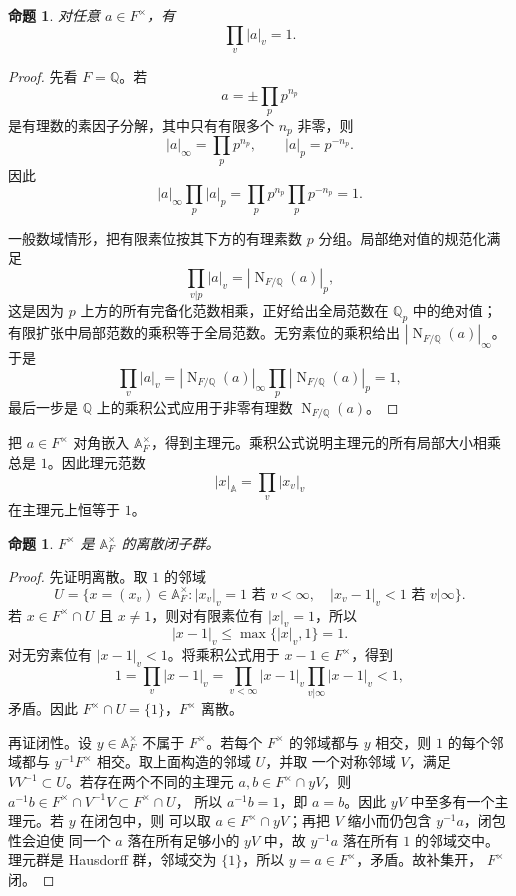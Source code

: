 \documentclass[11pt,a4paper,openany]{ctexbook}
\numberwithin{equation}{chapter}
\newcommand{\Q}{\mathbb{Q}}
\newcommand{\A}{\mathbb{A}}
\newcommand{\Nm}{\operatorname{N}}
\theoremstyle{plain}
\newtheorem{proposition}[theorem]{命题}
\theoremstyle{definition}
\theoremstyle{remark}
\begin{document}
\begin{proposition}
对任意 $a\in F^\times$，有
\[
 \prod_v |a|_v=1.
\]
\end{proposition}

\begin{proof}
先看 $F=\Q$。若
\[
 a=\pm\prod_pp^{n_p}
\]
是有理数的素因子分解，其中只有有限多个 $n_p$ 非零，则
\[
 |a|_\infty=\prod_pp^{n_p},\qquad |a|_p=p^{-n_p}.
\]
因此
\[
 |a|_\infty\prod_p|a|_p
 =\prod_pp^{n_p}\prod_pp^{-n_p}=1.
\]

一般数域情形，把有限素位按其下方的有理素数 $p$ 分组。局部绝对值的规范化满足
\[
 \prod_{v|p}|a|_v=|\Nm_{F/\Q}(a)|_p,
\]
这是因为 $p$ 上方的所有完备化范数相乘，正好给出全局范数在 $\Q_p$ 中的绝对值；
有限扩张中局部范数的乘积等于全局范数。无穷素位的乘积给出
$|\Nm_{F/\Q}(a)|_\infty$。于是
\[
 \prod_v|a|_v
 =|\Nm_{F/\Q}(a)|_\infty\prod_p|\Nm_{F/\Q}(a)|_p=1,
\]
最后一步是 $\Q$ 上的乘积公式应用于非零有理数 $\Nm_{F/\Q}(a)$。
\end{proof}

把 $a\in F^\times$ 对角嵌入 $\A_F^\times$，得到主理元。乘积公式说明主理元的所有局部大小相乘总是 $1$。因此理元范数
\[
 |x|_\A=\prod_v|x_v|_v
\]
在主理元上恒等于 $1$。

\begin{proposition}
$F^\times$ 是 $\A_F^\times$ 的离散闭子群。
\end{proposition}

\begin{proof}
先证明离散。取 $1$ 的邻域
\[
 U=\{x=(x_v)\in\A_F^\times:
 |x_v|_v=1\text{ 若 }v<\infty,\quad |x_v-1|_v<1\text{ 若 }v|\infty\}.
\]
若 $x\in F^\times\cap U$ 且 $x\ne1$，则对有限素位有 $|x|_v=1$，所以
\[
 |x-1|_v\le\max\{|x|_v,1\}=1.
\]
对无穷素位有 $|x-1|_v<1$。将乘积公式用于 $x-1\in F^\times$，得到
\[
 1=\prod_v|x-1|_v
 =\prod_{v<\infty}|x-1|_v\prod_{v|\infty}|x-1|_v<1,
\]
矛盾。因此 $F^\times\cap U=\{1\}$，$F^\times$ 离散。

再证闭性。设 $y\in\A_F^\times$ 不属于 $F^\times$。若每个 $F^\times$ 的邻域都与
$y$ 相交，则 $1$ 的每个邻域都与 $y^{-1}F^\times$ 相交。取上面构造的邻域 $U$，并取
一个对称邻域 $V$，满足 $VV^{-1}\subset U$。若存在两个不同的主理元
$a,b\in F^\times\cap yV$，则 $a^{-1}b\in F^\times\cap V^{-1}V\subset F^\times\cap U$，
所以 $a^{-1}b=1$，即 $a=b$。因此 $yV$ 中至多有一个主理元。若 $y$ 在闭包中，则
可以取 $a\in F^\times\cap yV$；再把 $V$ 缩小而仍包含 $y^{-1}a$，闭包性会迫使
同一个 $a$ 落在所有足够小的 $yV$ 中，故 $y^{-1}a$ 落在所有 $1$ 的邻域交中。理元群是
Hausdorff 群，邻域交为 $\{1\}$，所以 $y=a\in F^\times$，矛盾。故补集开，
$F^\times$ 闭。
\end{proof}
\end{document}
